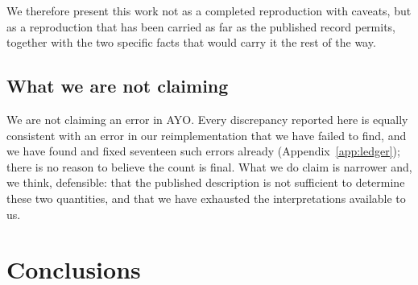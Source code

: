 \documentclass[11pt,a4paper]{article}
\begin{document}
We therefore present this work not as a completed reproduction with caveats, but as a
reproduction that has been carried as far as the published record permits, together with the two
specific facts that would carry it the rest of the way.

\subsection*{What we are not claiming}

We are not claiming an error in AYO. Every discrepancy reported here is equally consistent with an
error in our reimplementation that we have failed to find, and we have found and fixed seventeen
such errors already (Appendix~\ref{app:ledger}); there is no reason to believe the count is
final. What we do claim is narrower and, we think, defensible: that the published description is
not sufficient to determine these two quantities, and that we have exhausted the interpretations
available to us.

\section{Conclusions}
\end{document}
